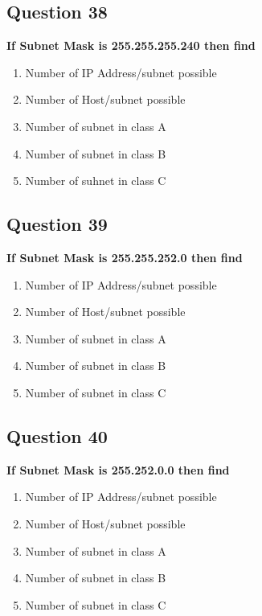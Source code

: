 \documentclass[12pt]{article}
\begin{document}
\subsection*{Question 38}
\textbf{If Subnet Mask is 255.255.255.240 then find}
\begin{enumerate}
    \item Number of IP Address/subnet possible
    \item Number of Host/subnet possible
    \item Number of subnet in class A
    \item Number of subnet in class B
    \item Number of suhnet in class C
\end{enumerate}

\subsection*{Question 39}
\textbf{If Subnet Mask is 255.255.252.0 then find}
\begin{enumerate}
    \item Number of IP Address/subnet possible
    \item Number of Host/subnet possible
    \item Number of subnet in class A
    \item Number of subnet in class B
    \item Number of subnet in class C
\end{enumerate}

\subsection*{Question 40}
\textbf{If Subnet Mask is 255.252.0.0 then find}
\begin{enumerate}
    \item Number of IP Address/subnet possible
    \item Number of Host/subnet possible
    \item Number of subnet in class A
    \item Number of subnet in class B
    \item Number of subnet in class C
\end{enumerate}
\end{document}
